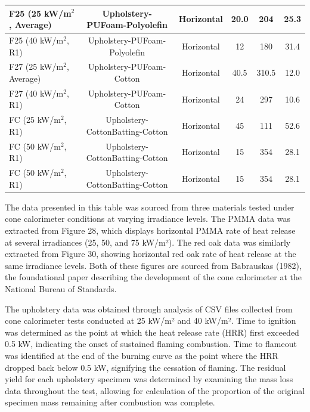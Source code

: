 \documentclass{abstract}
\begin{document}
\begin{table}[H]
\begin{tabularx}{\textwidth}{|L|c|c|c|c|c|}
    	\hline
    	F25 (25 kW/m$^2$, Average) & Upholstery-PUFoam-Polyolefin & Horizontal & 20.0 & 204 & 25.3 \\
    	\hline
    	F25 (40 kW/m$^2$, R1) & Upholstery-PUFoam-Polyolefin & Horizontal & 12 & 180 & 31.4 \\
    	\hline
    	F27 (25 kW/m$^2$, Average) & Upholstery-PUFoam-Cotton & Horizontal & 40.5 & 310.5 & 12.0 \\
    	\hline
    	F27 (40 kW/m$^2$, R1) & Upholstery-PUFoam-Cotton & Horizontal & 24 & 297 & 10.6 \\
    	\hline
    	FC (25 kW/m$^2$, R1) & Upholstery-CottonBatting-Cotton & Horizontal & 45 & 111 & 52.6 \\
    	\hline
    	FC (50 kW/m$^2$, R1) & Upholstery-CottonBatting-Cotton & Horizontal & 15 & 354 & 28.1 \\
    	\hline
		FC (50 kW/m$^2$, R1) & Upholstery-CottonBatting-Cotton & Horizontal & 15 & 354 & 28.1 \\
		\hline
	

    \end{tabularx}
\end{table}

The data presented in this table was sourced from three materials tested under cone calorimeter conditions at varying irradiance levels. The PMMA data was extracted from Figure 28, which displays horizontal PMMA rate of heat release at several irradiances (25, 50, and 75 kW/m²). The red oak data was similarly extracted from Figure 30, showing horizontal red oak rate of heat release at the same irradiance levels. Both of these figures are sourced from Babrauskas (1982), the foundational paper describing the development of the cone calorimeter at the National Bureau of Standards.

The upholstery data was obtained through analysis of CSV files collected from cone calorimeter tests conducted at 25 kW/m² and 40 kW/m². Time to ignition was determined as the point at which the heat release rate (HRR) first exceeded 0.5 kW, indicating the onset of sustained flaming combustion. Time to flameout was identified at the end of the burning curve as the point where the HRR dropped back below 0.5 kW, signifying the cessation of flaming. The residual yield for each upholstery specimen was determined by examining the mass loss data throughout the test, allowing for calculation of the proportion of the original specimen mass remaining after combustion was complete.

\pagebreak
\printbibliography
\end{document}
